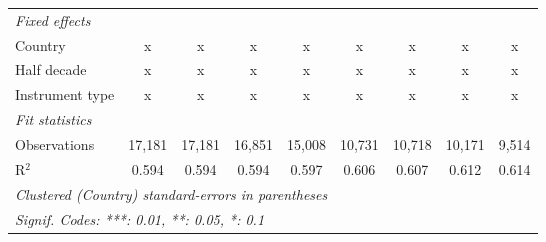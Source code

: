 \begin{tabular}{lcccccccc}
   \emph{Fixed effects}\\
   Country                                                    & x              & x              & x              & x              & x             & x             & x             & x\\  
   Half decade                                                & x              & x              & x              & x              & x             & x             & x             & x\\  
   Instrument type                                            & x              & x              & x              & x              & x             & x             & x             & x\\  
   \midrule \emph{Fit statistics}\\
   Observations                                               & 17,181         & 17,181         & 16,851         & 15,008         & 10,731        & 10,718        & 10,171        & 9,514\\  
   R$^2$                                                      & 0.594          & 0.594          & 0.594          & 0.597          & 0.606         & 0.607         & 0.612         & 0.614\\  
   \midrule
   \multicolumn{9}{l}{\emph{Clustered (Country) standard-errors in parentheses}}\\
   \multicolumn{9}{l}{\emph{Signif. Codes: ***: 0.01, **: 0.05, *: 0.1}}\\
\end{tabular}
\par\endgroup


